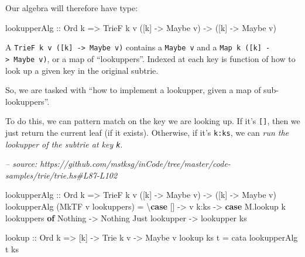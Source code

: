 \documentclass[]{article}
\newenvironment{Shaded}{}{}
\newcommand{\CommentTok}[1]{\textcolor[rgb]{0.38,0.63,0.69}{\textit{#1}}}
\newcommand{\DataTypeTok}[1]{\textcolor[rgb]{0.56,0.13,0.00}{#1}}
\newcommand{\FunctionTok}[1]{\textcolor[rgb]{0.02,0.16,0.49}{#1}}
\newcommand{\KeywordTok}[1]{\textcolor[rgb]{0.00,0.44,0.13}{\textbf{#1}}}
\newcommand{\NormalTok}[1]{#1}
\newcommand{\OtherTok}[1]{\textcolor[rgb]{0.00,0.44,0.13}{#1}}
\begin{document}
Our algebra will therefore have type:

\begin{Shaded}
\begin{Highlighting}[]
\NormalTok{lookupperAlg}
\OtherTok{    ::} \DataTypeTok{Ord}\NormalTok{ k}
    \OtherTok{=>} \DataTypeTok{TrieF}\NormalTok{ k v ([k] }\OtherTok{->} \DataTypeTok{Maybe}\NormalTok{ v)}
    \OtherTok{->}\NormalTok{ ([k] }\OtherTok{->} \DataTypeTok{Maybe}\NormalTok{ v)}
\end{Highlighting}
\end{Shaded}

A \texttt{TrieF\ k\ v\ ({[}k{]}\ -\textgreater{}\ Maybe\ v)} contains a
\texttt{Maybe\ v} and a \texttt{Map\ k\ ({[}k{]}\ -\textgreater{}\ Maybe\ v)},
or a map of ``lookuppers''. Indexed at each key is function of how to look up a
given key in the original subtrie.

So, we are tasked with ``how to implement a lookupper, given a map of
sub-lookuppers''.

To do this, we can pattern match on the key we are looking up. If it's
\texttt{{[}{]}}, then we just return the current leaf (if it exists). Otherwise,
if it's \texttt{k:ks}, we can \emph{run the lookupper of the subtrie at key
\texttt{k}}.

\begin{Shaded}
\begin{Highlighting}[]
\CommentTok{-- source: https://github.com/mstksg/inCode/tree/master/code-samples/trie/trie.hs#L87-L102}

\NormalTok{lookupperAlg}
\OtherTok{    ::} \DataTypeTok{Ord}\NormalTok{ k}
    \OtherTok{=>} \DataTypeTok{TrieF}\NormalTok{ k v ([k] }\OtherTok{->} \DataTypeTok{Maybe}\NormalTok{ v)}
    \OtherTok{->}\NormalTok{ ([k] }\OtherTok{->} \DataTypeTok{Maybe}\NormalTok{ v)}
\NormalTok{lookupperAlg (}\DataTypeTok{MkTF}\NormalTok{ v lookuppers) }\FunctionTok{=}\NormalTok{ \textbackslash{}}\KeywordTok{case}
\NormalTok{    []   }\OtherTok{->}\NormalTok{ v}
\NormalTok{    k}\FunctionTok{:}\NormalTok{ks }\OtherTok{->} \KeywordTok{case}\NormalTok{ M.lookup k lookuppers }\KeywordTok{of}
      \DataTypeTok{Nothing}        \OtherTok{->} \DataTypeTok{Nothing}
      \DataTypeTok{Just}\NormalTok{ lookupper }\OtherTok{->}\NormalTok{ lookupper ks}

\NormalTok{lookup}
\OtherTok{    ::} \DataTypeTok{Ord}\NormalTok{ k}
    \OtherTok{=>}\NormalTok{ [k]}
    \OtherTok{->} \DataTypeTok{Trie}\NormalTok{ k v}
    \OtherTok{->} \DataTypeTok{Maybe}\NormalTok{ v}
\NormalTok{lookup ks t }\FunctionTok{=}\NormalTok{ cata lookupperAlg t ks}
\end{Highlighting}
\end{Shaded}
\end{document}
